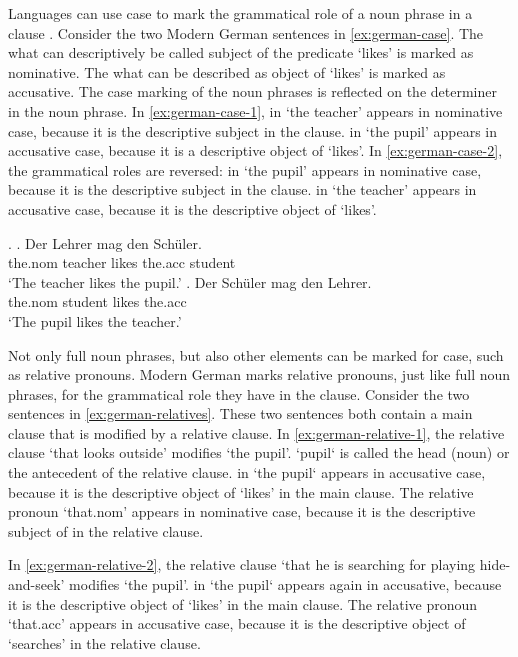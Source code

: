 Languages can use case to mark the grammatical role of a noun phrase in a clause \citep[cf.][]{moravcsik2009}. Consider the two Modern German sentences in \ref{ex:german-case}. The what can descriptively be called subject of the predicate  `likes' is marked as nominative. The what can be described as object of  `likes' is marked as accusative. The case marking of the noun phrases is reflected on the determiner in the noun phrase.
In \ref{ex:german-case-1},  in  `the teacher' appears in nominative case, because it is the descriptive subject in the clause.  in  `the pupil' appears in accusative case, because it is a descriptive object of  `likes'.
In \ref{ex:german-case-2}, the grammatical roles are reversed:  in  `the pupil' appears in nominative case, because it is the descriptive subject in the clause.  in  `the teacher' appears in accusative case, because it is the descriptive object of  `likes'.

\ex.\label{ex:german-case}
\ag. Der Lehrer mag den Schüler.\\
 the.\ac{nom} teacher likes the.\ac{acc} student\\
 `The teacher likes the pupil.'\label{ex:german-case-1}
\bg. Der Schüler mag den Lehrer.\\
 the.\ac{nom} student likes the.\ac{acc}\\
 `The pupil likes the teacher.'\label{ex:german-case-2}

Not only full noun phrases, but also other elements can be marked for case, such as relative pronouns. Modern German marks relative pronouns, just like full noun phrases, for the grammatical role they have in the clause. Consider the two sentences in \ref{ex:german-relatives}. These two sentences both contain a main clause that is modified by a relative clause.
In \ref{ex:german-relative-1}, the relative clause  `that looks outside' modifies  `the pupil'.  `pupil` is called the head (noun) or the antecedent of the relative clause.  in  `the pupil` appears in accusative case, because it is the descriptive object of  `likes' in the main clause. The relative pronoun  `that.\ac{nom}' appears in nominative case, because it is the descriptive subject of in the relative clause.

In \ref{ex:german-relative-2}, the relative clause  `that he is searching for playing hide-and-seek' modifies  `the pupil'.  in  `the pupil` appears again in accusative, because it is the descriptive object of  `likes' in the main clause. The relative pronoun  `that.\ac{acc}' appears in accusative case, because it is the descriptive object of  `searches' in the relative clause.

